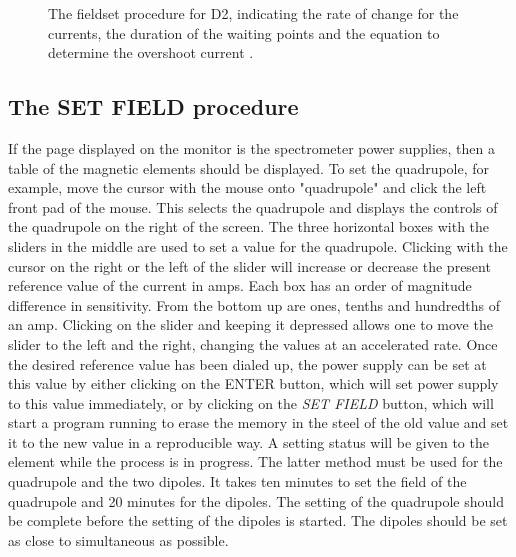 \documentclass[11pt]{report}
\begin{document}
\begin{figure}[!ht]
\centerline{\vspace{0cm}\hspace{0cm}
 }
\centering
\caption{ The fieldset procedure for D2, indicating the rate of change for the currents, the duration 
of the waiting points and the equation to determine the overshoot current \cite{Gar10}.}
\label{fig:D2setfield}
\end{figure} 


\subsection{The SET FIELD procedure}\label{sec:SETFIELD}

\bigskip
{}
\bigskip


If the page displayed on the monitor is the spectrometer power supplies,    
then a table of the magnetic elements should be displayed. To set the 
quadrupole, for example, move the cursor with the mouse onto "quadrupole"
and click the left front pad of the mouse. This selects the quadrupole 
and displays the controls of the quadrupole on the right of the screen.
The three horizontal boxes with the sliders in the middle are used to 
set a value for the quadrupole. Clicking with the cursor on the right or
the left of the slider will increase or decrease the present reference
value of the current in amps. Each box has an order of magnitude difference
in sensitivity. From the bottom up are ones, tenths and hundredths of an 
amp. Clicking on the slider and keeping it depressed allows one to move
the slider to the left and the right, changing the values at an 
accelerated rate. Once the desired reference value has been dialed up, the 
power supply can be set at this value by either clicking on the ENTER
button, which will set power supply to this value immediately, or by 
clicking on the {\it SET FIELD} button, which will start a program running to 
erase the memory in the steel of the old value and set it to the new value 
in a reproducible way. A setting status will be given to the element while
the process is in progress. The latter method must be used for the quadrupole 
and the two dipoles. It takes ten minutes to set the field of the quadrupole 
and 20 minutes for the dipoles. The setting of the quadrupole should be
complete before the setting of the dipoles is started. The dipoles should 
be set as close to simultaneous as possible.        
\end{document}
